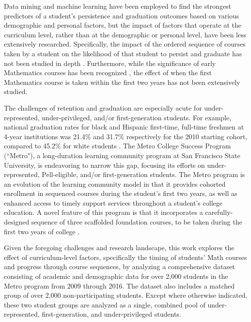 \documentclass[conference]{IEEEtran}
\begin{document}
Data mining  \cite{Saa, Shahiri, Asif} and machine learning \cite{Romero_2010, Gopalakrishnan} have been employed to find the strongest predictors of a student's persistence and graduation outcomes based on various demographic and personal factors, but the impact of factors that operate at the curriculum level, rather than at the demographic or personal level, have been less extensively researched.  Specifically, the impact of the ordered sequence of courses taken by a student on the likelihood of that student to persist and graduate has not been studied in depth \cite{Bhaskaran}.  Furthermore, while the significance of early Mathematics courses has been recognized \cite{Bhaskaran}, the effect of when the first Mathematics course is taken within the first two years has not been extensively studied.

The challenges of retention and graduation are especially acute for under-represented, under-privileged, and/or first-generation students.  For example, national graduation rates for black and Hispanic first-time, full-time freshmen at 4-year institutions was 21.4\% and 31.7\% respectively for the 2010 starting cohort, compared to 45.2\% for white students  \cite{NCES_grad}.  The Metro College Success Program (``Metro"), a long-duration learning community program at San Francisco State University, is endeavoring to narrow this gap, focusing its efforts on under-represented, Pell-eligible, and/or first-generation students.  The Metro program is an evolution of the learning community model \cite{Tinto, Zhao} in that it provides cohorted enrollment in sequenced courses during the student's first two years, as well as enhanced access to timely support services throughout a student's college education. A novel feature of this program is that it incorporates a carefully-designed sequence of three scaffolded foundation courses, to be taken during the first two years of college \cite{Metrowebsite}. %

Given the foregoing challenges and research landscape, this work explores the effect of curriculum-level factors, specifically the timing of students' Math courses and progress through course sequences, by analyzing a comprehensive dataset consisting of academic and demographic data for over 2,000 students in the Metro program from 2009 through 2016. The dataset also includes a matched group of over 2,000 non-participating students.  Except where otherwise indicated, these two student groups are analyzed as a single, combined pool of under-represented, first-generation, and under-privileged students. 
\end{document}
